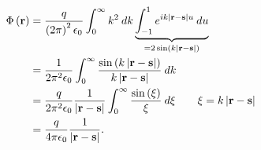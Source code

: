 \documentclass[10pt]{mypackage}
\begin{document}
\begin{example}
  \begin{align*}
    \Phi\left(\mathbf{r}\right) &= \frac{q}{\left(2\pi\right)^2\epsilon_0}\int_{0}^{\infty} k^2\:dk\underbrace{\int_{-1}^{1} e^{ik\left\vert \mathbf{r}-\mathbf{s} \right\vert u}\:du}_{=2\sin\left(k\left\vert \mathbf{r}-\mathbf{s} \right\vert\right)}\\
                                &= \frac{1}{2\pi^2\epsilon_0}\int_{0}^{\infty} \frac{\sin\left(k\left\vert \mathbf{r}-\mathbf{s} \right\vert\right)}{k\left\vert \mathbf{r}-\mathbf{s} \right\vert}\:dk\\
                                &= \frac{q}{2\pi^2\epsilon_0}\frac{1}{\left\vert \mathbf{r}-\mathbf{s} \right\vert}\int_{0}^{\infty} \frac{\sin\left(\xi\right)}{\xi}\:d\xi\tag*{$\xi = k\left\vert \mathbf{r}-\mathbf{s} \right\vert$}\\
                                &= \frac{q}{4\pi\epsilon_0}\frac{1}{\left\vert \mathbf{r}-\mathbf{s} \right\vert}.
  \end{align*}
\end{example}
\end{document}
